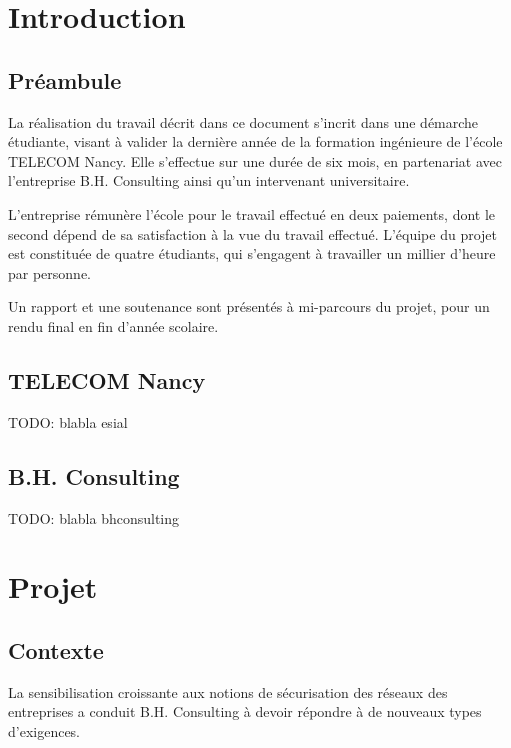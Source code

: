 \newcommand{\titreA}{Rapport de projet}
\newcommand{\titreB}{Projet industriel}


\listoffigures
\newpage

\section{Introduction}
\subsection{Préambule}

La réalisation du travail décrit dans ce document s'incrit dans une démarche étudiante, visant à valider la dernière année de la formation ingénieure de l'école TELECOM Nancy. Elle s'effectue sur une durée de six mois, en partenariat avec l'entreprise B.H. Consulting ainsi qu'un intervenant universitaire.

L'entreprise rémunère l'école pour le travail effectué en deux paiements, dont le second dépend de sa satisfaction à la vue du travail effectué. L'équipe du projet est constituée de quatre étudiants, qui s'engagent à travailler un millier d'heure par personne.

Un rapport et une soutenance sont présentés à mi-parcours du projet, pour un rendu final en fin d'année scolaire.

\subsection{TELECOM Nancy}

TODO: blabla esial

\subsection{B.H. Consulting}

TODO: blabla bhconsulting

\section{Projet}
\subsection{Contexte}

La sensibilisation croissante aux notions de sécurisation des réseaux des entreprises a conduit B.H. Consulting à devoir répondre à de nouveaux types d'exigences.

